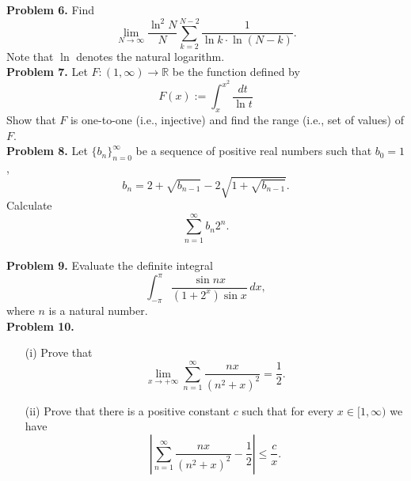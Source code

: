 \documentclass{article}
\begin{document}
\textbf{Problem 6.}
Find \[
\lim_{N \to \infty} \frac{\ln^2 N}{N} \sum_{k=2}^{N-2} \frac{1}{\ln k \cdot \ln (N-k)}.
\]
Note that \( \ln \) denotes the natural logarithm.
\\

\textbf{Problem 7.}
Let \( F : (1, \infty) \to \mathbb{R} \) be the function defined by
\[
    F(x) := \int_x^{x^2} \frac{dt}{\ln t}
\]
Show that \( F \) is one-to-one (i.e., injective) and find the range (i.e., set of values) of \( F \).
\\

\textbf{Problem 8.}
Let \( \{b_n\}_{n=0}^{\infty} \) be a sequence of positive real numbers such that \( b_0 = 1 \),
\[
b_n = 2 + \sqrt{b_{n-1}} - 2\sqrt{1+\sqrt{b_{n-1}}}.
\]
Calculate
\[
\sum_{n=1}^{\infty} b_n 2^n.
\]
\\

\textbf{Problem 9.}
Evaluate the definite integral
\[
\int_{-\pi}^{\pi} \frac{\sin nx}{(1 + 2^x) \sin x} \,dx,
\]
where \( n \) is a natural number.
\\

\textbf{Problem 10.}
\begin{itemize}
    \item[(i)] Prove that
    \[
    \lim_{x \to +\infty} \sum_{n=1}^{\infty} \frac{nx}{(n^2 + x)^2} = \frac{1}{2}.
    \]
    \item[(ii)] Prove that there is a positive constant \( c \) such that for every \( x \in [1, \infty) \) we have
    \[
    \left| \sum_{n=1}^{\infty} \frac{nx}{(n^2 + x)^2} - \frac{1}{2} \right| \leq \frac{c}{x}.
    \]
\end{itemize}
\end{document}
